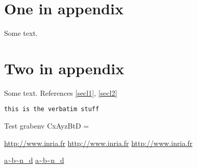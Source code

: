 \documentclass {article}
\begin{document}
\section{One in appendix} Some text. \label{secl2}
\section{Two in appendix} Some text. 
References \ref{secl1}, \ref{secl2}

\makeatletter
{} {}
\makeatother

\begin{lstlisting}[caption={EBNF definition of a configuration},
   escapeinside=YY,label={lst: config ebnf}]
this is the verbatim stuff
\end{lstlisting}


\newenvironment {simple}{A}{B} 
\newenvironment {grab}{C}{D\grabbed} 

Test grabenv
\begin{grab}x\grabenv\grabbed \begin{simple}yz\end{simple}t\end{grab}
\grabbed=%

\url{http://www.inria.fr}
\url*{http://www.inria.fr}
\href{http://www.inria.fr}{http://www.inria.fr}

\href{a~b\~n_d}{\url{a~b\~n_d}}
\url{a~b\~n_d}
\end{document}

